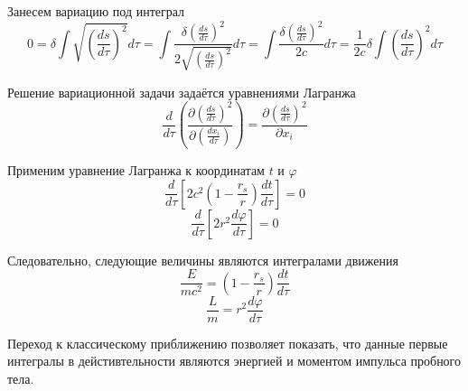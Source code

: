 \documentclass[14pt, a4paper]{report}
\begin{document}
Занесем вариацию под интеграл
\[0=\delta\int\sqrt{\left(\frac{ds}{d\tau}\right)^2}d\tau=\int\frac{\delta\left(\frac{ds}{d\tau}\right)^2}{2\sqrt{\left(\frac{ds}{d\tau}\right)^2}}d\tau=\int\frac{\delta\left(\frac{ds}{d\tau}\right)^2}{2c}d\tau=\frac{1}{2c}\delta\int\left(\frac{ds}{d\tau}\right)^2 d\tau\]

Решение вариационной задачи задаётся уравнениями Лагранжа
\[\frac{d}{d\tau}\left(\frac{\partial \left(\frac{ds}{d\tau}\right)^2}{\partial \left(\frac{dx_i}{d\tau}\right)}\right)=\frac{\partial \left(\frac{ds}{d\tau}\right)^2}{\partial x_i}\]

Применим уравнение Лагранжа к координатам $t$ и $\varphi$
\[\frac{d}{d\tau}\left[2c^2\left(1-\frac{r_s}{r}\right)\frac{dt}{d\tau}\right]=0\]
\[\frac{d}{d\tau}\left[2r^2\frac{d\varphi}{d\tau}\right]=0\]

Следовательно, следующие величины являются интегралами движения
\[\frac{E}{mc^2}=\left(1-\frac{r_s}{r}\right)\frac{dt}{d\tau}\]
\[\frac{L}{m}=r^2\frac{d\varphi}{d\tau}\]

Переход к классическому приближению позволяет показать, что данные первые интегралы в дейстивтельности являются энергией и моментом импульса пробного тела.
\end{document}
